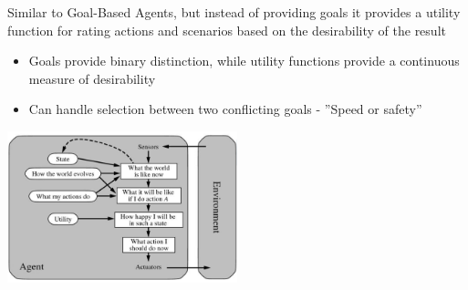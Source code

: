 \documentclass[
../../EiKI_Summary.tex,
]
{subfiles}
\begin{document}
\begin{defbox}
    Similar to Goal-Based Agents, but instead of providing goals it provides a utility function for rating actions and scenarios based on the desirability of the result
    \begin{itemize}
        \item Goals provide binary distinction, while utility functions provide a continuous measure of desirability
        \item Can handle selection between two conflicting goals - ''Speed or safety''
    \end{itemize}

    \begin{center}
        \includegraphics[width=0.5\textwidth]{Pics/UtilityBasedAgent.png}
    \end{center}
\end{defbox}
\end{document}
